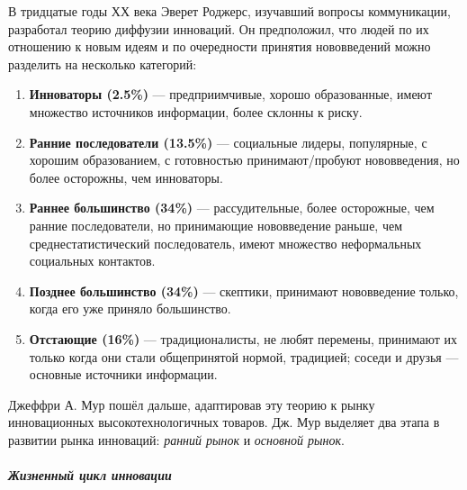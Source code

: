 \documentclass[11pt]{article}
\theoremstyle{plain} %
\theoremstyle{definition} %
\theoremstyle{remark} %
\begin{document}
В тридцатые годы ХХ века Эверет Роджерс, изучавший вопросы коммуникации, разработал  теорию  диффузии  инноваций.  Он  предположил,  что  людей  по  их отношению  к  новым  идеям  и  по  очередности  принятия  нововведений  можно разделить на несколько категорий:
\begin{enumerate}
	\item \textbf{Инноваторы (2.5\%)} --- предприимчивые,  хорошо  образованные,  имеют  множество  источников информации, более склонны к риску.
	\item \textbf{Ранние последователи (13.5\%)} --- социальные лидеры, популярные, с хорошим образованием,  с  готовностью принимают/пробуют  нововведения,  но  более осторожны, чем инноваторы.
	\item \textbf{Раннее большинство (34\%)} --- рассудительные, более осторожные, чем ранние последователи,    но    принимающие    нововведение    раньше,    чем среднестатистический  последователь,  имеют  множество  неформальных социальных контактов.
	\item \textbf{Позднее  большинство (34\%)} --- скептики,  принимают  нововведение только, когда его уже приняло большинство.
	\item \textbf{Отстающие (16\%)} --- традиционалисты,  не  любят  перемены,  принимают  их только когда они стали общепринятой нормой, традицией; соседи и друзья  --- основные источники информации.
\end{enumerate}


Джеффри  А.  Мур  пошёл  дальше,  адаптировав  эту  теорию  к  рынку инновационных высокотехнологичных товаров. Дж. Мур выделяет два этапа в развитии рынка инноваций: \textit{ранний рынок} и \textit{основной рынок}.

\subparagraph{Жизненный цикл инновации}
\end{document}
